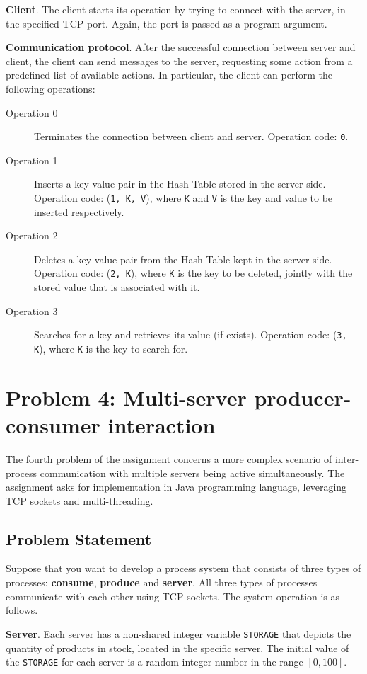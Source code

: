 \documentclass[acmlarge]{acmart}
\newcommand{\storage}{{\small \texttt{STORAGE}} }
\begin{document}
\textbf{Client}. The client starts its operation by trying to connect with the server, in the specified TCP port. Again, the port is passed as a program argument.

\textbf{Communication protocol}. After the successful connection between server and client, the client can send messages to the server, requesting some action from a predefined list of available actions. In particular, the client can perform the following operations:
\begin{description}
  \item[Operation 0] Terminates the connection between client and server. Operation code: \texttt{0}.
  \item[Operation 1] Inserts a key-value pair in the Hash Table stored in the server-side. Operation code: (\texttt{1, K, V}), where \texttt{K} and \texttt{V} is the key and value to be inserted respectively.
  \item[Operation 2] Deletes a key-value pair from the Hash Table kept in the server-side. Operation code: (\texttt{2, K}), where \texttt{K} is the key to be deleted, jointly with the stored value that is associated with it.
  \item[Operation 3] Searches for a key and retrieves its value (if exists). Operation code: (\texttt{3, K}), where \texttt{K} is the key to search for.
\end{description}


\section{Problem 4: Multi-server producer-consumer interaction}
\label{section:problem4}
The fourth problem of the assignment concerns a more complex scenario of inter-process communication with multiple servers being active simultaneously. The assignment asks for implementation in Java programming language, leveraging TCP sockets and multi-threading.
\subsection{Problem Statement}
Suppose that you want to develop a process system that consists of three types of processes: \textbf{consume}, \textbf{produce} and \textbf{server}. All three types of processes communicate with each other using TCP sockets. The system operation is as follows.

\textbf{Server}. Each server has a non-shared integer variable \storage that depicts the quantity of products in stock, located in the specific server. The initial value of the \storage for each server is a random integer number in the range $[0, 100]$.
\end{document}
